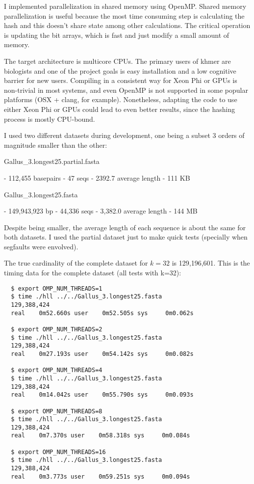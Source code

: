 \documentclass{bioinfo}
\begin{document}
I implemented parallelization in shared memory using OpenMP.
Shared memory parallelization is useful because the most time consuming
step is calculating the hash and this doesn't share state among other calculations.
The critical operation is updating the bit arrays,
which is fast and just modify a small amount of memory.

The target architecture is multicore CPUs.
The primary users of khmer are biologists and one of the project goals is easy installation and a low cognitive barrier for new users.
Compiling in a consistent way for Xeon Phi or GPUs is non-trivial in most systems,
and even OpenMP is not supported in some popular platforms (OSX + clang, for example).
Nonetheless,
adapting the code to use either Xeon Phi or GPUs could lead to even better results,
since the hashing process is mostly CPU-bound.

I used two different datasets during development,
one being a subset 3 orders of magnitude smaller than the other:

Gallus\_3.longest25.partial.fasta

  - 112,455 basepairs
  - 47 seqs
  - 2392.7 average length
  - 111 KB

Gallus\_3.longest25.fasta

  - 149,943,923 bp
  - 44,336 seqs
  - 3,382.0 average length
  - 144 MB

Despite being smaller,
the average length of each sequence is about the same for both datasets.
I used the partial dataset just to make quick tests
(specially when segfaults were envolved).

The true cardinality of the complete dataset for $k=32$ is 129,196,601.
This is the timing data for the complete dataset (all tests with k=32):

\begin{verbatim}
  $ export OMP_NUM_THREADS=1
  $ time ./hll ../../Gallus_3.longest25.fasta
  129,388,424
  real    0m52.660s user    0m52.505s sys     0m0.062s

  $ export OMP_NUM_THREADS=2
  $ time ./hll ../../Gallus_3.longest25.fasta
  129,388,424
  real    0m27.193s user    0m54.142s sys     0m0.082s

  $ export OMP_NUM_THREADS=4
  $ time ./hll ../../Gallus_3.longest25.fasta
  129,388,424
  real    0m14.042s user    0m55.790s sys     0m0.093s

  $ export OMP_NUM_THREADS=8
  $ time ./hll ../../Gallus_3.longest25.fasta
  129,388,424
  real    0m7.370s user    0m58.318s sys     0m0.084s

  $ export OMP_NUM_THREADS=16
  $ time ./hll ../../Gallus_3.longest25.fasta
  129,388,424
  real    0m3.773s user    0m59.251s sys     0m0.094s
\end{verbatim}
\end{document}
